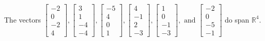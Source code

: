 \begin{exercise}
\begin{exerciseStatement}
  \end{exerciseStatement}
  \begin{exerciseAnswer}
   The vectors \(\left[\begin{array}{r}
-2 \\
0 \\
-2 \\
4
\end{array}\right] , \left[\begin{array}{r}
3 \\
1 \\
-4 \\
-4
\end{array}\right] , \left[\begin{array}{r}
-5 \\
4 \\
0 \\
1
\end{array}\right] , \left[\begin{array}{r}
4 \\
-1 \\
2 \\
-3
\end{array}\right] , \left[\begin{array}{r}
1 \\
0 \\
-1 \\
-3
\end{array}\right] , \text{ and } \left[\begin{array}{r}
-2 \\
0 \\
-5 \\
-1
\end{array}\right]\) 
  	 do  
	span \(\mathbb{R}^4\).
  


  \end{exerciseAnswer}
\end{exercise}